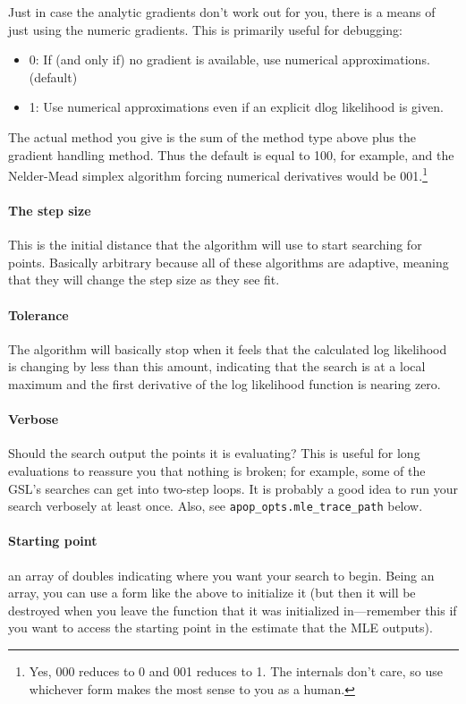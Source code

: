 Just in case the analytic gradients don't work out for you, there is a
means of just using the numeric gradients. This is primarily useful for debugging:

\begin{itemize}
\item 0: If (and only if) no gradient is available, use numerical approximations.  (default)
\item 1: Use numerical approximations even if an explicit dlog likelihood is given. 
\end{itemize}

The actual method you give is the sum of the method type above plus the
gradient handling method. Thus the default is equal to 100, for example, and the
Nelder-Mead simplex algorithm forcing numerical derivatives would be
001.\footnote{Yes, 000 reduces to 0 and 001 reduces to 1. The internals
don't care, so use whichever form makes the most sense to you as a human.}


\paragraph{The step size} This is the initial distance that the
algorithm will use to start searching for points. Basically arbitrary
because all of these algorithms are adaptive, meaning that they will
change the step size as they see fit.

\paragraph{Tolerance} The algorithm will basically stop when it feels
that the calculated log likelihood is changing by less than this amount,
indicating that the search is at a local maximum and the first derivative of
the log likelihood function is nearing zero.

\paragraph{Verbose} Should the search output the points it is evaluating?
This is useful for long evaluations to reassure you that nothing is
broken; for example, some of the GSL's searches can get into two-step loops.
It is probably a good idea to run your search verbosely at least once.
Also, see {\tt apop\_opts.mle\_trace\_path} below.

\paragraph{Starting point} an array of doubles indicating where you want
your search to begin. Being an array, you can use a form like the above
to initialize it (but then it will be destroyed when you leave the
function that it was initialized in---remember this if you want to
access the starting point in the estimate that the MLE outputs).


